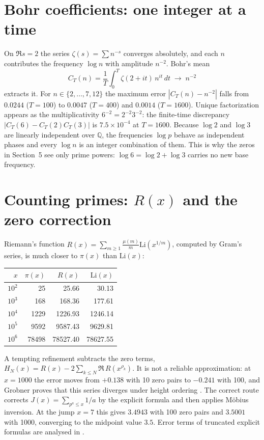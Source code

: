 \documentclass[11pt]{article}
\begin{document}
\section{Bohr coefficients: one integer at a time}

On $\Re s=2$ the series $\zeta(s)=\sum n^{-s}$ converges absolutely, and each $n$ contributes the frequency $\log n$ with amplitude $n^{-2}$. Bohr's mean \cite{bohr1925}
\[
C_T(n)=\frac1T\int_0^T\zeta(2+it)\,n^{it}\,dt\;\longrightarrow\;n^{-2}
\]
extracts it. For $n\in\{2,\dots,7,12\}$ the maximum error $|C_T(n)-n^{-2}|$ falls from $0.0244$ ($T=100$) to $0.0047$ ($T=400$) and $0.0014$ ($T=1600$). Unique factorization appears as the multiplicativity $6^{-2}=2^{-2}3^{-2}$: the finite-time discrepancy $|C_T(6)-C_T(2)C_T(3)|$ is $7.5\times10^{-4}$ at $T=1600$. Because $\log2$ and $\log3$ are linearly independent over $\mathbb{Q}$, the frequencies $\log p$ behave as independent phases and every $\log n$ is an integer combination of them. This is why the zeros in Section~5 see only prime powers: $\log 6=\log2+\log3$ carries no new base frequency.

\section{Counting primes: $R(x)$ and the zero correction}

Riemann's function $R(x)=\sum_{m\ge1}\frac{\mu(m)}{m}\mathrm{Li}(x^{1/m})$, computed by Gram's series, is much closer to $\pi(x)$ than $\mathrm{Li}(x)$:

\begin{center}
\begin{tabular}{rrrr}
\toprule
$x$ & $\pi(x)$ & $R(x)$ & $\mathrm{Li}(x)$\\
\midrule
$10^2$ & 25 & 25.66 & 30.13\\
$10^3$ & 168 & 168.36 & 177.61\\
$10^4$ & 1229 & 1226.93 & 1246.14\\
$10^5$ & 9592 & 9587.43 & 9629.81\\
$10^6$ & 78498 & 78527.40 & 78627.55\\
\bottomrule
\end{tabular}
\end{center}

A tempting refinement subtracts the zero terms, $H_N(x)=R(x)-2\sum_{k\le N}\Re\,R(x^{\rho_k})$. It is not a reliable approximation: at $x=1000$ the error moves from $+0.138$ with 10 zero pairs to $-0.241$ with 100, and Grobner proves that this series diverges under height ordering \cite{grobner2026}. The correct route corrects $J(x)=\sum_{p^a\le x}1/a$ by the explicit formula and then applies M\"obius inversion. At the jump $x=7$ this gives $3.4943$ with 100 zero pairs and $3.5001$ with 1000, converging to the midpoint value $3.5$. Error terms of truncated explicit formulas are analysed in \cite{cullyhugilljohnston2021,doron1995}.
\end{document}
